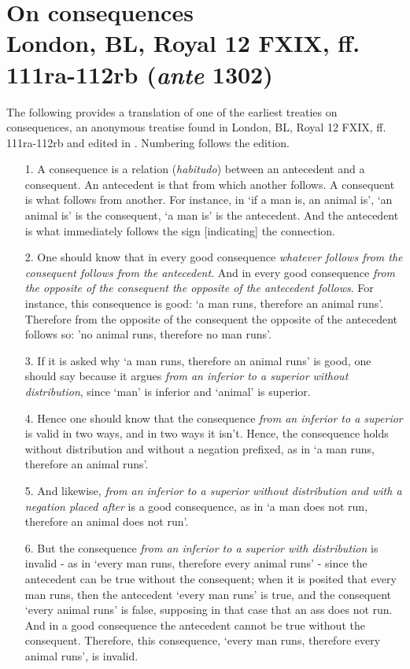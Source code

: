 \chapter[Anonymous 1, on consequences]{On consequences
\\London, BL, Royal 12 FXIX, ff. 111ra-112rb (\textit{ante} 1302)}
The following provides a translation of one of the earliest treaties on consequences, an anonymous treatise found in London, BL, Royal 12 FXIX, ff. 111ra-112rb and edited in \cite[pp. 4-11]{Green-Pedersen1980a}. Numbering follows the edition.
\begin{enumerate}
\item[1.] A consequence is a relation (\textit{habitudo}) between an antecedent and a consequent. An antecedent is that from which another follows. A consequent is what follows from another. For instance, in `if a man is, an animal is', `an animal is' is the consequent, `a man is' is the antecedent. And the antecedent is what immediately follows the sign [indicating] the connection.
\item[2.] One should know that in every good consequence \textit{whatever follows from the consequent follows from the antecedent}. And in every good consequence \textit{from the opposite of the consequent the opposite of the antecedent follows}. For instance, this consequence is good: `a man runs, therefore an animal runs'. Therefore from the opposite of the consequent the opposite of the antecedent follows so: 'no animal runs, therefore no man runs'.
\item[3.] If it is asked why `a man runs, therefore an animal runs' is good, one should say because it argues \textit{from an inferior to a superior without distribution}, since `man' is inferior and `animal' is superior.
\item[4.] Hence one should know that the consequence \textit{from an inferior to a superior} is valid in two ways, and in two ways it isn't. Hence, the consequence holds without distribution and without a negation prefixed, as in `a man runs, therefore an animal runs'.
\item[5.] And likewise, \textit{from an inferior to a superior without distribution and with a negation placed after} is a good consequence, as in `a man does not run, therefore an animal does not run'.
\item[6.] But the consequence \textit{from an inferior to a superior with distribution} is invalid - as in `every man runs, therefore every animal runs' - since the antecedent can be true without the consequent; when it is posited that every man runs, then the antecedent `every man runs' is true, and the consequent `every animal runs' is false, supposing in that case that an ass does not run. And in a good consequence the antecedent cannot be true without the consequent. Therefore, this consequence, `every man runs, therefore every animal runs', is invalid. 

\end{enumerate}
